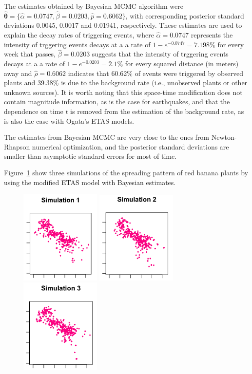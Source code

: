 \documentclass[11pt]{article}\usepackage[]{graphicx}\usepackage[]{color}
\newcommand{\bfig}{\begin{figure}}
\newcommand{\efig}{\end{figure}}
\begin{document}
{The estimates obtained by Bayesian MCMC algorithm were $\boldsymbol{\hat\theta} = \{\hat\alpha = 0.0747, \hat\beta = 0.0203, \hat p = 0.6062\}$, with corresponding posterior standard deviations 0.0045, 0.0017 and 0.01941, respectively. These estimates are used to explain the decay rates of triggering events, where $\hat\alpha = 0.0747$ represents the intensity of trggering events decays at a a rate of $1-e^{-0.0747}=7.198\%$ for every week that passes, $\hat\beta = 0.0203$ suggests that the intensity of trggering events decays at a a rate of $1-e^{-0.0203}=2.1\%$ for every squared distance (in meters) away and $\hat\rho = 0.6062$ indicates that 60.62\% of events were triggered by observed plants and 39.38\% is due to the background rate (i.e., unobserved plants or other unknown sources). It is worth noting that this space-time modification does not contain magnitude information, as is the case for earthquakes, and that the dependence on time $t$ is removed from the estimation of the background rate, as is also the case with Ogata's ETAS models.

The estimates from Bayesian MCMC are very close to the ones from Newton-Rhapson numerical optimization, and the posterior standard deviations are smaller than asymptotic standard errors for most of time.

Figure~\ref{Sims1} show three simulations of the spreading pattern of red banana plants by using the modified ETAS model with Bayesian estimates.

\bfig\centering
\includegraphics[width=4cm]{figures/simulation1.png}
\includegraphics[width=4cm]{figures/simulation2.png}
\includegraphics[width=4cm]{figures/simulation3.png}
\caption{}
\label{Sims1}
\efig

}
\end{document}
